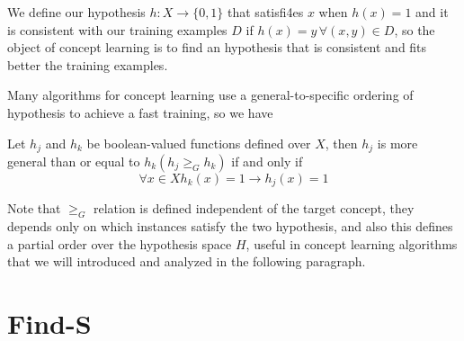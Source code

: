 We define our hypothesis $h: X \to \{0, 1\}$ that satisfi4es $x$ when $h(x) = 1$ and it is consistent with our training examples $D$ if $h(x) = y \, \forall (x, y) \in D$,
so the object of concept learning is to find an hypothesis that is consistent and fits better the training examples.

Many algorithms for concept learning use a general-to-specific ordering of hypothesis to achieve a fast training, so we have
\begin{defi}
	Let $h_j$ and $h_k$ be boolean-valued functions defined over $X$, then $h_j$ is more general than or equal to $h_k (h_j \geq _G h_k)$ if and only if 
	\[ \forall x \in X h_k(x) = 1 \to h_j(x) = 1 \]
\end{defi}
Note that $\geq _G$ relation is defined independent of the target concept, they depends only on which instances satisfy the two hypothesis, and also 
this defines a partial order over the hypothesis space $H$, useful in concept learning algorithms that we will introduced and analyzed in the following paragraph.

\section{Find-S}



